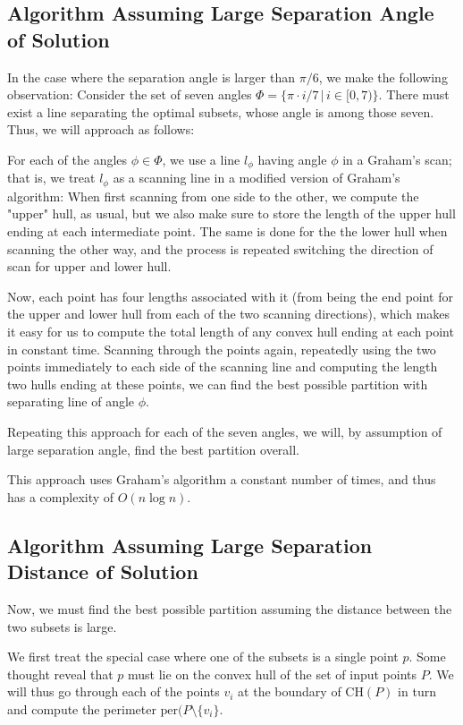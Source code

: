 \documentclass{article}
\begin{document}
\subsection{Algorithm Assuming Large Separation Angle of Solution}

In the case where the separation angle is larger than $\pi / 6$, we make the following observation: Consider the set of seven angles $\Phi = \{\pi \cdot i / 7 \,  | \, i \in [0, 7) \}$. There must exist a line separating the optimal subsets, whose angle is among those seven. Thus, we will approach as follows:

For each of the angles $\phi \in \Phi$, we use a line $l_\phi$ having angle $\phi$ in a Graham's scan; that is, we treat $l_\phi$ as a scanning line in a modified version of Graham's algorithm: When first scanning from one side to the other, we compute the "upper" hull, as usual, but we also make sure to store the length of the upper hull ending at each intermediate point. The same is done for the the lower hull when scanning the other way, and the process is repeated switching the direction of scan for upper and lower hull. 

Now, each point has four lengths associated with it (from being the end point for the upper and lower hull from each of the two scanning directions), which makes it easy for us to compute the total length of any convex hull ending at each point in constant time. Scanning through the points again, repeatedly using the two points immediately to each side of the scanning line and computing the length two hulls ending at these points, we can find the best possible partition with separating line of angle $\phi$.

Repeating this approach for each of the seven angles, we will, by assumption of large separation angle, find the best partition overall.

This approach uses Graham's algorithm a constant number of times, and thus has a complexity of $O(n \log n)$.

\subsection{Algorithm Assuming Large Separation Distance of Solution}

Now, we must find the best possible partition assuming the distance between the two subsets is large. 

We first treat the special case where one of the subsets is a single point $p$. Some thought reveal that $p$ must lie on the convex hull of the set of input points $P$. We will thus go through each of the points $v_i$ at the boundary of $\text{CH}(P)$ in turn and compute the perimeter $\text{per}(P \setminus \{v_i\}$. 
\end{document}
